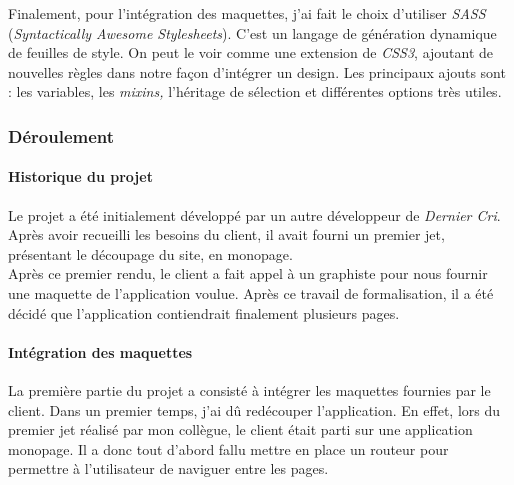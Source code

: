 \documentclass[12pt,a4paper]{article}
\begin{document}
  \bigskip

  Finalement, pour l'intégration des maquettes, j'ai fait le choix
  d'utiliser \emph{SASS} (\emph{Syntactically Awesome Stylesheets}). C'est
  un langage de génération dynamique de feuilles de style. On peut le voir
  comme une extension de \emph{CSS3}, ajoutant de nouvelles règles dans
  notre façon d'intégrer un design. Les principaux ajouts sont : les
  variables, les \emph{mixins,} l'héritage de sélection et différentes
  options très utiles.

  \bigskip

  \subsubsection{Déroulement}\label{duxe9roulement}

  \bigskip

  \paragraph{Historique du projet}\label{historique-du-projet}

  \bigskip

  Le projet a été initialement développé par un autre développeur de
  \emph{Dernier Cri}. Après avoir recueilli les besoins du client, il
  avait fourni un premier jet, présentant le découpage du site, en
  monopage.\\
  Après ce premier rendu, le client a fait appel à un graphiste pour nous
  fournir une maquette de l'application voulue. Après ce travail de
  formalisation, il a été décidé que l'application contiendrait finalement
  plusieurs pages.

  \bigskip

  \paragraph{Intégration des
  maquettes}\label{intuxe9gration-des-maquettes}

  \bigskip

  La première partie du projet a consisté à intégrer les maquettes
  fournies par le client. Dans un premier temps, j'ai dû redécouper
  l'application. En effet, lors du premier jet réalisé par mon collègue,
  le client était parti sur une application monopage. Il a donc tout
  d'abord fallu mettre en place un routeur pour permettre à l'utilisateur
  de naviguer entre les pages.

  \bigskip
\end{document}
